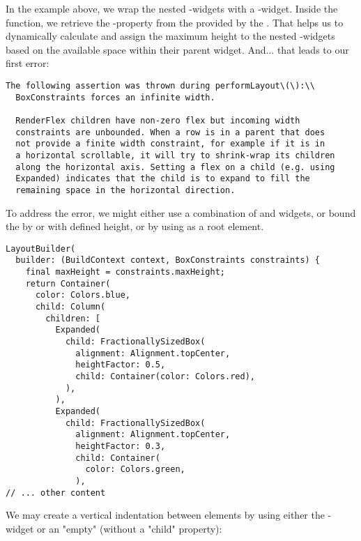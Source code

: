 \noindent In the example above, we wrap the nested -widgets with a -widget. Inside the 
 function, we retrieve the -property from the  provided by the . 
That helps us to dynamically calculate and assign the maximum height to the nested -widgets based on the 
available space within their parent widget. And... that leads to our first error: 

\begin{lstlisting}[language=terminal]
The following assertion was thrown during performLayout\(\):\\
  BoxConstraints forces an infinite width.

  RenderFlex children have non-zero flex but incoming width 
  constraints are unbounded. When a row is in a parent that does 
  not provide a finite width constraint, for example if it is in 
  a horizontal scrollable, it will try to shrink-wrap its children 
  along the horizontal axis. Setting a flex on a child (e.g. using 
  Expanded) indicates that the child is to expand to fill the 
  remaining space in the horizontal direction.
\end{lstlisting}

\noindent To address the error, we might either use a combination of  and  widgets,
or bound the  by  or  with defined height, or by using  as a root 
element.

\begin{lstlisting}
LayoutBuilder(
  builder: (BuildContext context, BoxConstraints constraints) {
    final maxHeight = constraints.maxHeight;
    return Container(
      color: Colors.blue,
      child: Column(
        children: [
          Expanded(
            child: FractionallySizedBox(
              alignment: Alignment.topCenter,
              heightFactor: 0.5,
              child: Container(color: Colors.red),
            ),
          ),
          Expanded(
            child: FractionallySizedBox(
              alignment: Alignment.topCenter,
              heightFactor: 0.3,
              child: Container(
                color: Colors.green,
              ),
// ... other content
\end{lstlisting}

\noindent We may create a vertical indentation between elements by using either the -widget or an "empty" 
 (without a "child" property):

